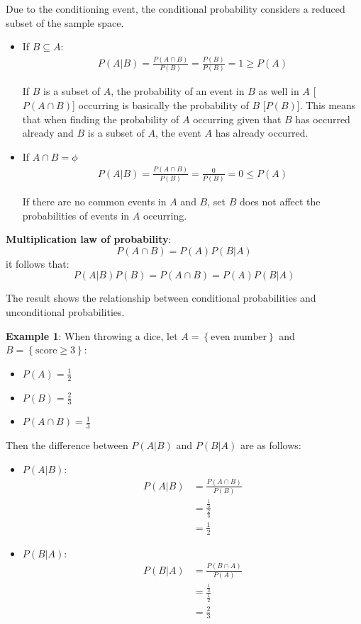 \documentclass[10pt,a4paper]{article}
\begin{document}
Due to the conditioning event, the conditional probability considers a reduced subset of the sample
space.
\begin{itemize}
    \item If $B\subseteq A$:
    \begin{align*}
        P(A|B) = \frac{P(A\cap B)}{P(B)} = \frac{P(B)}{P(B)} = 1 \geq P(A)
    \end{align*}

    If $B$ is a subset of $A$, the probability of an event in $B$ as well in $A$ [$P(A\cap B)$] occurring is
    basically the probability of $B$ [$P(B)$]. This means that when finding the probability of $A$
    occurring given that $B$ has occurred already and $B$ is a subset of $A$, the event $A$ has
    already occurred.

    \item If $A \cap B = \phi$
    \begin{align*}
        P(A|B) = \frac{P(A\cap B)}{P(B)} = \frac{0}{P(B)} = 0 \leq P(A)
    \end{align*} 

    If there are no common events in $A$ and $B$, set $B$ does not affect the probabilities of
    events in $A$ occurring. 
\end{itemize}

\textbf{Multiplication law of probability}: 
$$
    P(A \cap B) = P(A)P(B|A)
$$
it follows that:
$$
    P(A|B)P(B) = P(A \cap B)=P(A)P(B|A)
$$

The result shows the relationship between conditional probabilities and unconditional probabilities.

\textbf{Example 1}: When throwing a dice, let $A = \left\{\text{even number}\right\}$ and
$B=\left\{\text{score}\geq 3\right\}$:
\begin{itemize}
    \item $P(A)=\frac{1}{2}$
    \item $P(B)=\frac{2}{3}$
    \item $P(A\cap B)=\frac{1}{3}$
\end{itemize}

Then the difference between $P(A|B)$ and $P(B|A)$ are as follows:
\begin{itemize}
    \item $P(A|B)$:
    \begin{align*}
        P(A|B) &= \frac{P(A\cap B)}{P(B)} \\
        &= \frac{\frac{1}{3}}{\frac{2}{3}} \\
        &= \frac{1}{2}
    \end{align*}

    \item $P(B|A)$:
    \begin{align*}
        P(B|A) &= \frac{P(B\cap A)}{P(A)} \\
        &= \frac{\frac{1}{3}}{\frac{1}{2}} \\
        &=\frac{2}{3}
    \end{align*}
\end{itemize}
\end{document}
